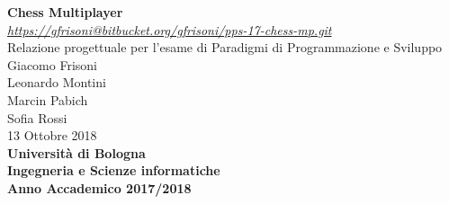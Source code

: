 \documentclass[12pt,a4paper]{article}
\begin{document}
\begin{titlepage}
\begin{center}
\vspace*{40mm}
{\Large{\textbf{Chess Multiplayer}}}\\
\vspace*{4mm}
{\small{\textit{\url{https://gfrisoni@bitbucket.org/gfrisoni/pps-17-chess-mp.git}}}}\\
\vspace*{4mm}
{\Large{Relazione progettuale per l'esame di Paradigmi di Programmazione e Sviluppo}}\\
\vspace{10mm}
{\Large{
Giacomo Frisoni\\
Leonardo Montini\\
Marcin Pabich\\
Sofia Rossi\\
}}
\vspace{10mm}
{\large{13 Ottobre 2018}}\\
\vspace{20mm}
{\large{\bf Universit\`a di Bologna}}\\
\vspace{1mm}
{\large{\bf Ingegneria e Scienze informatiche}}\\
\vspace{1mm}
{\large{\bf Anno Accademico 2017/2018}}
\vspace*{\fill}
\end{center}
\end{titlepage}
\end{document}
